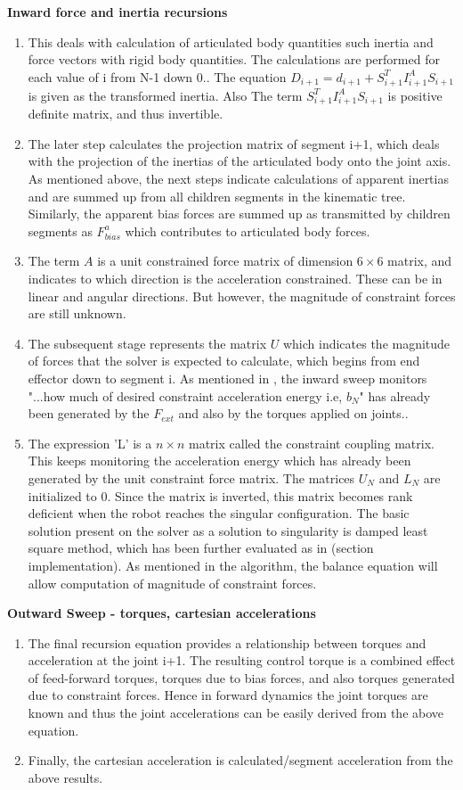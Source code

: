 \textbf{Inward force and inertia recursions}
\begin{enumerate}
	\item This deals with calculation of articulated body quantities such inertia and force vectors with rigid body quantities. The calculations are performed for each value of i from N-1 down 0.\cite{featherstone}. The equation ${D_{i+1} = d_{i+1} + S_{i+1}^T I_{i+1}^A S_{i+1} }$ is given as the transformed inertia. Also The term $S_{i+1}^T I_{i+1}^A S_{i+1}$ is positive definite matrix, and thus invertible. 
	\item The later step calculates the projection matrix of segment i+1, which deals with the projection of the inertias of the articulated body onto the joint axis. As mentioned above, the next steps indicate calculations of apparent inertias and are summed up from all children segments in the kinematic tree. Similarly, the apparent bias forces are summed up as transmitted by children segments as $F_{bias}^{a}$ which contributes to articulated body forces.
	\item The term $A$ is a unit constrained force matrix of dimension $6\times6$ matrix, and indicates to which direction is the acceleration constrained. These can be in linear and angular directions. But however, the magnitude of constraint forces are still unknown. 
	\item The subsequent stage represents the matrix $U$ which indicates the magnitude of forces that the solver is expected to calculate, which begins from end effector down to segment i. As mentioned in \cite{shakhimardanov2015}, the inward sweep monitors "...how much of desired constraint acceleration energy i.e, $b_{N}$" has already been generated by the $F_{ext}$ and also by the torques applied on joints.\cite{shakhimardanov2015}. 
	\item The expression 'L' is a $n\times n$ matrix called the constraint coupling matrix. This keeps monitoring the acceleration energy which has already been generated by the unit constraint force matrix. The matrices $U_{N}$ and $L_{N}$ are initialized to 0. Since the matrix is inverted, this matrix becomes rank deficient when the robot reaches the singular configuration. The basic solution present on the solver as a solution to singularity is damped least square method, which has been further evaluated as in (section implementation). As mentioned in the algorithm, the balance equation will allow computation of magnitude of constraint forces.	
\end{enumerate}
\textbf{Outward Sweep - torques, cartesian accelerations}
\begin{enumerate}
	\item The final recursion equation provides a relationship between torques and acceleration at the joint i+1. The resulting control torque is a combined effect of feed-forward torques, torques due to bias forces, and also torques generated due to constraint forces. Hence in forward dynamics the joint torques are known and thus the joint accelerations can be easily derived from the above equation.
	\item Finally, the cartesian acceleration is calculated/segment acceleration from the above results.
\end{enumerate}
